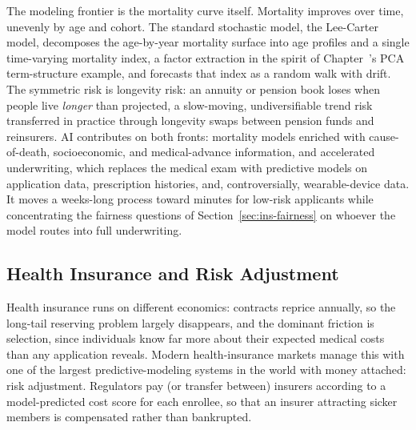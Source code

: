 \documentclass[../ai_in_finance]{subfiles}
\begin{document}
The modeling frontier is the mortality curve itself. Mortality improves over time, unevenly by age and cohort. The standard stochastic model, the Lee-Carter model, decomposes the age-by-year mortality surface into age profiles and a single time-varying mortality index, a factor extraction in the spirit of Chapter~'s PCA term-structure example, and forecasts that index as a random walk with drift. The symmetric risk is longevity risk: an annuity or pension book loses when people live \emph{longer} than projected, a slow-moving, undiversifiable trend risk transferred in practice through longevity swaps between pension funds and reinsurers. AI contributes on both fronts: mortality models enriched with cause-of-death, socioeconomic, and medical-advance information, and accelerated underwriting, which replaces the medical exam with predictive models on application data, prescription histories, and, controversially, wearable-device data. It moves a weeks-long process toward minutes for low-risk applicants while concentrating the fairness questions of Section~\ref{sec:ins-fairness} on whoever the model routes into full underwriting.

\subsection{Health Insurance and Risk Adjustment}
\label{sec:ins-health}

Health insurance runs on different economics: contracts reprice annually, so the long-tail reserving problem largely disappears, and the dominant friction is selection, since individuals know far more about their expected medical costs than any application reveals. Modern health-insurance markets manage this with one of the largest predictive-modeling systems in the world with money attached: risk adjustment. Regulators pay (or transfer between) insurers according to a model-predicted cost score for each enrollee, so that an insurer attracting sicker members is compensated rather than bankrupted.
\end{document}
